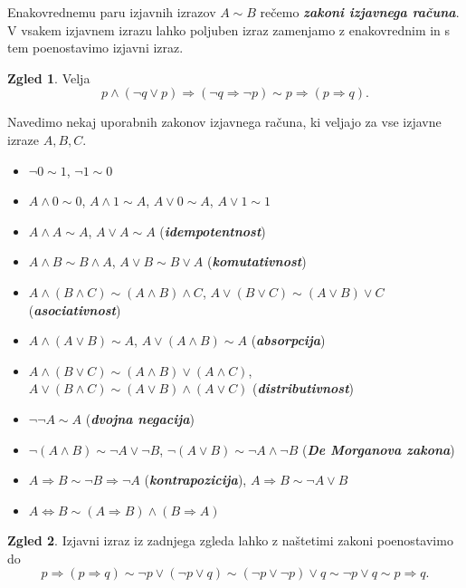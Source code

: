 \documentclass[11pt]{book}
\def\definicija{\color{rdeca}\bf\em}
\theoremstyle{definition}
\theoremstyle{zgled}
\newtheorem*{zgled}{Zgled}
\theoremstyle{odprtproblem}
\theoremstyle{domacanaloga}
\theoremstyle{izrek}
\begin{document}
Enakovrednemu paru izjavnih izrazov $A \sim B$ rečemo {\definicija zakoni izjavnega računa}. V vsakem izjavnem izrazu lahko poljuben izraz zamenjamo z enakovrednim in s tem poenostavimo izjavni izraz.

\begin{zgled}
Velja
\[
    p \land (\lnot q \lor p) \Rightarrow (\lnot q \Rightarrow \lnot p) \sim
    p \Rightarrow (p \Rightarrow q).
\]
\end{zgled}

Navedimo nekaj uporabnih zakonov izjavnega računa, ki veljajo za vse izjavne izraze $A,B,C$.
\begin{itemize}
    \item $\lnot 0 \sim 1$, $\lnot 1 \sim 0$
    \item $A \land 0 \sim 0$, $A \land 1 \sim A$, $A \lor 0 \sim A$, $A \lor 1 \sim 1$
    \item $A \land A \sim A$, $A \lor A \sim A$ ({\definicija idempotentnost})
    \item $A \land B \sim B \land A$, $A \lor B \sim B \lor A$ ({\definicija komutativnost})
    \item $A \land (B \land C) \sim (A \land B) \land C$, $A \lor (B \lor C) \sim (A \lor B) \lor C$ ({\definicija asociativnost})
    \item $A \land (A \lor B) \sim A$, $A \lor (A \land B) \sim A$ ({\definicija absorpcija})
    \item $A \land (B \lor C) \sim (A \land B) \lor (A \land C)$, $A \lor (B \land C) \sim (A \lor B) \land (A \lor C)$ ({\definicija distributivnost})
    \item $\lnot \lnot A \sim A$ ({\definicija dvojna negacija})
    \item $\lnot (A \land B) \sim \lnot A \lor \lnot B$, $\lnot (A \lor B) \sim \lnot A \land \lnot B$ ({\definicija De Morganova zakona})
    \item $A \Rightarrow B \sim \lnot B \Rightarrow \lnot A$ ({\definicija kontrapozicija}), $A \Rightarrow B \sim \lnot A \lor B$
    \item $A \Leftrightarrow B \sim (A \Rightarrow B) \land (B \Rightarrow A)$
\end{itemize}

\begin{zgled}
Izjavni izraz iz zadnjega zgleda lahko z naštetimi zakoni poenostavimo do
\[
    p \Rightarrow (p \Rightarrow q) \sim
    \lnot p \lor (\lnot p \lor q) \sim
    (\lnot p \lor \lnot p) \lor q \sim
    \lnot p \lor q \sim
    p \Rightarrow q.
\]
\end{zgled}
\end{document}
